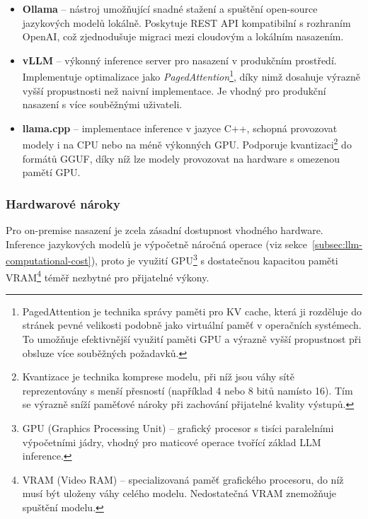 \begin{itemize}
    \item \textbf{Ollama} \cite{ollama} -- nástroj umožňující snadné stažení a spuštění open-source jazykových modelů lokálně.
    Poskytuje REST API kompatibilní s rozhraním OpenAI, což zjednodušuje migraci mezi cloudovým a lokálním nasazením.

    \item \textbf{vLLM} \cite{vllm2023} -- výkonný inference server pro nasazení v produkčním prostředí.
    Implementuje optimalizace jako \emph{PagedAttention}\footnote{PagedAttention je technika správy paměti pro KV cache, která ji rozděluje do stránek pevné velikosti podobně jako virtuální paměť v operačních systémech. To umožňuje efektivnější využití paměti GPU a výrazně vyšší propustnost při obsluze více souběžných požadavků.}, díky nimž dosahuje výrazně vyšší propustnosti než naivní implementace.
    Je vhodný pro produkční nasazení s více souběžnými uživateli.

    \item \textbf{llama.cpp} \cite{llamacpp} -- implementace inference v jazyce C++, schopná provozovat modely i na CPU nebo na méně výkonných GPU.
    Podporuje kvantizaci\footnote{Kvantizace je technika komprese modelu, při níž jsou váhy sítě reprezentovány s menší přesností (například 4 nebo 8 bitů namísto 16). Tím se výrazně sníží paměťové nároky při zachování přijatelné kvality výstupů.} do formátů GGUF, díky níž lze modely provozovat na hardware s omezenou pamětí GPU.
\end{itemize}

\subsubsection*{Hardwarové nároky}

Pro on-premise nasazení je zcela zásadní dostupnost vhodného hardware.
Inference jazykových modelů je výpočetně náročná operace (viz sekce~\ref{subsec:llm-computational-cost}), proto je využití GPU\footnote{GPU (Graphics Processing Unit) -- grafický procesor s tisíci paralelními výpočetními jádry, vhodný pro maticové operace tvořící základ LLM inference.}
s dostatečnou kapacitou paměti VRAM\footnote{VRAM (Video RAM) -- specializovaná paměť grafického procesoru, do níž musí být uloženy váhy celého modelu. Nedostatečná VRAM znemožňuje spuštění modelu.}
téměř nezbytné pro přijatelné výkony.

